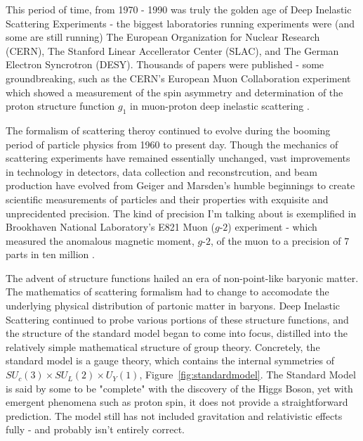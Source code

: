 This period of time, from 1970 - 1990 was truly the golden age of Deep Inelastic
Scattering Experiments - the biggest laboratories running experiments were (and
some are still running) The European Organization for Nuclear Research (CERN),
The Stanford Linear Accellerator Center (SLAC), and The German Electron
Syncrotron (DESY). Thousands of papers were published - some groundbreaking,
such as the CERN's European Muon Collaboration experiment which showed a
measurement of the spin asymmetry and determination of the proton structure
function $g_1$ in muon-proton deep inelastic scattering  \cite{Ashman1988}. 

The formalism of scattering theroy continued to evolve during the booming period
of particle physics from 1960 to present day. Though the mechanics of scattering
experiments have remained essentially unchanged, vast improvements in technology
in detectors, data collection and reconstrcution, and beam production have
evolved from Geiger and Marsden's humble beginnings to create scientific
measurements of particles and their properties with exquisite and unprecidented
precision. The kind of precision I'm talking about is exemplified in Brookhaven
National Laboratory's E821 Muon ($g$-$2$) experiment - which measured the
anomalous magnetic moment, $g$-$2$, of the muon to a precision of 7 parts in ten
million  \cite{Bennett}.

The advent of structure functions hailed an era of non-point-like baryonic
matter. The mathematics of scattering formalism had to change to accomodate the
underlying physical distribution of partonic matter in baryons. Deep Inelastic
Scattering continued to probe various portions of these structure functions, and
the structure of the standard model began to come into focus, distilled into the
relatively simple mathematical structure of group theory. Concretely, the
standard model is a gauge theory, which contains the internal symmetries of
$SU_{c}(3) \times SU_{L}(2) \times U_{Y}(1)$, Figure~\ref{fig:standardmodel}.
The Standard Model is said by some to be "complete" with the discovery of the
Higgs Boson, yet with emergent phenomena such as proton spin, it does not
provide a straightforward prediction. The model still has not included
gravitation and relativistic effects fully - and probably isn't entirely
correct.


